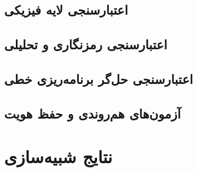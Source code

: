 \documentclass[11pt, a4paper, oneside]{book}
\begin{document}
	\chapter{اعتبارسنجی لایه فیزیکی}
	\label{ch:val_physics}
	
	
	\chapter{اعتبارسنجی رمزنگاری و تحلیلی}
	\label{ch:val_crypto}
	
	
	\chapter{اعتبارسنجی حل‌گر برنامه‌ریزی خطی}
	\label{ch:val_lp}
	
	
	\chapter{آزمون‌های هم‌روندی و حفظ هویت}
	\label{ch:val_concurrency}
	
	
	\part{نتایج شبیه‌سازی}
	\label{part:results_final}     %
	
	
\end{document}
